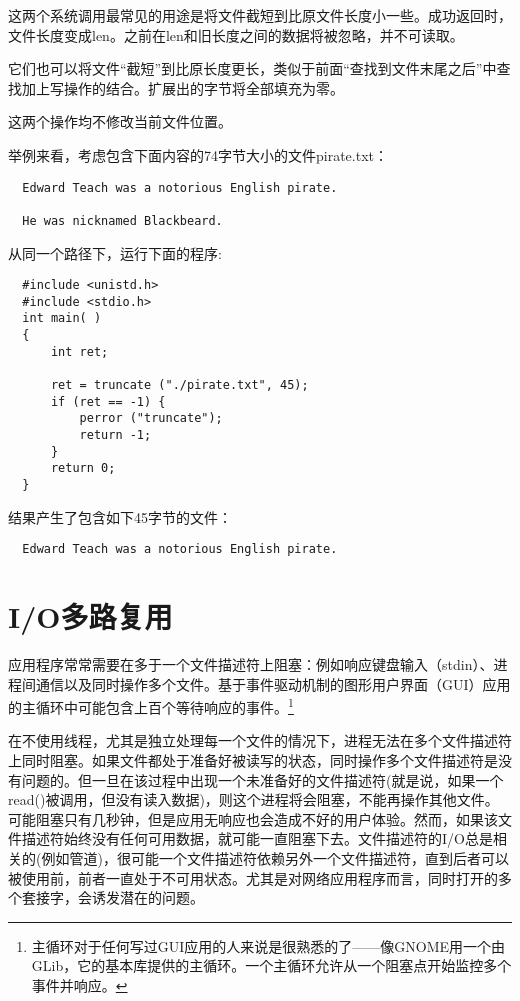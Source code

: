 这两个系统调用最常见的用途是将文件截短到比原文件长度小一些。成功返回时，文件长度变成len。之前在len和旧长度之间的数据将被忽略，并不可读取。

它们也可以将文件“截短”到比原长度更长，类似于前面“查找到文件末尾之后”中查找加上写操作的结合。扩展出的字节将全部填充为零。

这两个操作均不修改当前文件位置。

举例来看，考虑包含下面内容的74字节大小的文件pirate.txt：

\begin{verbatim}
  Edward Teach was a notorious English pirate.

  He was nicknamed Blackbeard.
\end{verbatim}

从同一个路径下，运行下面的程序: 

\begin{lstlisting}
  #include <unistd.h>
  #include <stdio.h>
  int main( )
  {
      int ret;

      ret = truncate ("./pirate.txt", 45);
      if (ret == -1) {
          perror ("truncate");
          return -1;
      }
      return 0;
  }
\end{lstlisting}

结果产生了包含如下45字节的文件：

\begin{verbatim}
  Edward Teach was a notorious English pirate. 
\end{verbatim}

\section{I/O多路复用}

应用程序常常需要在多于一个文件描述符上阻塞：例如响应键盘输入（stdin）、进程间通信以及同时操作多个文件。基于事件驱动机制的图形用户界面（GUI）应用的主循环中可能包含上百个等待响应的事件。\footnote[1]{主循环对于任何写过GUI应用的人来说是很熟悉的了——像GNOME用一个由GLib，它的基本库提供的主循环。一个主循环允许从一个阻塞点开始监控多个事件并响应。}

在不使用线程，尤其是独立处理每一个文件的情况下，进程无法在多个文件描述符上同时阻塞。如果文件都处于准备好被读写的状态，同时操作多个文件描述符是没有问题的。但一旦在该过程中出现一个未准备好的文件描述符(就是说，如果一个read()被调用，但没有读入数据)，则这个进程将会阻塞，不能再操作其他文件。可能阻塞只有几秒钟，但是应用无响应也会造成不好的用户体验。然而，如果该文件描述符始终没有任何可用数据，就可能一直阻塞下去。文件描述符的I/O总是相关的(例如管道)，很可能一个文件描述符依赖另外一个文件描述符，直到后者可以被使用前，前者一直处于不可用状态。尤其是对网络应用程序而言，同时打开的多个套接字，会诱发潜在的问题。

